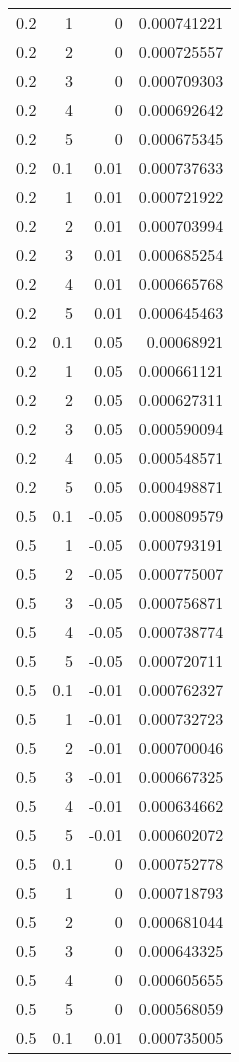 \documentclass{amsart}
\theoremstyle{plain}
\numberwithin{equation}{section}
\begin{document}
\begin{longtable}{r | r | r | r}
0.2 & 1 & 0 & 0.000741221 \\ 
0.2 & 2 & 0 & 0.000725557 \\ 
0.2 & 3 & 0 & 0.000709303 \\ 
0.2 & 4 & 0 & 0.000692642 \\ 
0.2 & 5 & 0 & 0.000675345 \\ \hline
0.2 & 0.1 & 0.01 & 0.000737633 \\ 
0.2 & 1 & 0.01 & 0.000721922 \\ 
0.2 & 2 & 0.01 & 0.000703994 \\ 
0.2 & 3 & 0.01 & 0.000685254 \\ 
0.2 & 4 & 0.01 & 0.000665768 \\ 
0.2 & 5 & 0.01 & 0.000645463 \\ \hline
0.2 & 0.1 & 0.05 & 0.00068921 \\ 
0.2 & 1 & 0.05 & 0.000661121 \\ 
0.2 & 2 & 0.05 & 0.000627311 \\ 
0.2 & 3 & 0.05 & 0.000590094 \\ 
0.2 & 4 & 0.05 & 0.000548571 \\ 
0.2 & 5 & 0.05 & 0.000498871 \\ \hline
0.5 & 0.1 & -0.05 & 0.000809579 \\ 
0.5 & 1 & -0.05 & 0.000793191 \\ 
0.5 & 2 & -0.05 & 0.000775007 \\ 
0.5 & 3 & -0.05 & 0.000756871 \\ 
0.5 & 4 & -0.05 & 0.000738774 \\ 
0.5 & 5 & -0.05 & 0.000720711 \\ \hline
0.5 & 0.1 & -0.01 & 0.000762327 \\ 
0.5 & 1 & -0.01 & 0.000732723 \\ 
0.5 & 2 & -0.01 & 0.000700046 \\ 
0.5 & 3 & -0.01 & 0.000667325 \\ 
0.5 & 4 & -0.01 & 0.000634662 \\ 
0.5 & 5 & -0.01 & 0.000602072 \\ \hline
0.5 & 0.1 & 0 & 0.000752778 \\ 
0.5 & 1 & 0 & 0.000718793 \\ 
0.5 & 2 & 0 & 0.000681044 \\ 
0.5 & 3 & 0 & 0.000643325 \\ 
0.5 & 4 & 0 & 0.000605655 \\ 
0.5 & 5 & 0 & 0.000568059 \\ \hline
0.5 & 0.1 & 0.01 & 0.000735005 \\ 

\end{longtable}
\end{document}
